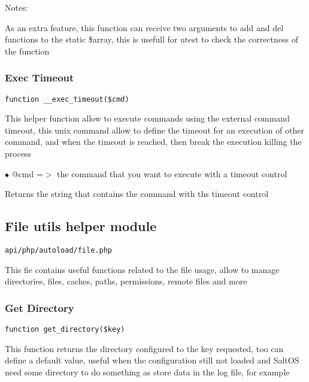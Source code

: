 \documentclass[a4paper]{article}
\begin{document}
Notes:

As an extra feature, this function can receive two arguments
to add and del functions to the static \$array, this is usefull
for utest to check the correctness of the function

\hypertarget{toc126}{}
\subsubsection{Exec Timeout}

\begin{lstlisting}
function __exec_timeout($cmd)
\end{lstlisting}

This helper function allow to execute commands using the external
command timeout, this unix command allow to define the timeout for
an execution of other command, and when the timeout is reached, then
break the execution killing the process

\begin{compactitem}
\item[\color{myblue}$\bullet$] @cmd =$>$ the command that you want to execute with a timeout control
\end{compactitem}

Returns the string that contains the command with ths timeout control

\hypertarget{toc127}{}
\subsection{File utils helper module}

\begin{lstlisting}
api/php/autoload/file.php
\end{lstlisting}

This fie contains useful functions related to the file usage, allow to manage directories, files,
caches, paths, permissions, remote files and more

\hypertarget{toc128}{}
\subsubsection{Get Directory}

\begin{lstlisting}
function get_directory($key)
\end{lstlisting}

This function returns the directory configured to the key requested, too can define a default
value, useful when the configuration still not loaded and SaltOS need some directory to do
something as store data in the log file, for example
\end{document}
